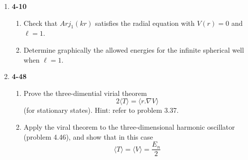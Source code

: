 \documentclass[fleqn]{article}
\begin{document}
  \begin{enumerate}
    \item \textbf{4-10} 
    \begin{enumerate}
      \item Check that $Arj_1(kr)$ satisfies the radial equation with $V(r)=0$ and $\ell=1$.
      \item Determine graphically the allowed energies for the infinite spherical well when $\ell=1$.
    \end{enumerate}

    \item \textbf{4-48} 
    \begin{enumerate}
      \item Prove the three-dimential virial theorem
      $$2\langle T \rangle=\langle r.\nabla V\rangle$$
      (for stationary states). Hint: refer to problem 3.37. 
      \item Apply the viral theorem to the three-dimensional harmonic oscillator (problem 4.46), and show 
      that in this case
      $$\langle T \rangle=\langle V \rangle=\dfrac{E_n}{2}$$
    \end{enumerate}
    


  \end{enumerate}
\end{document}
